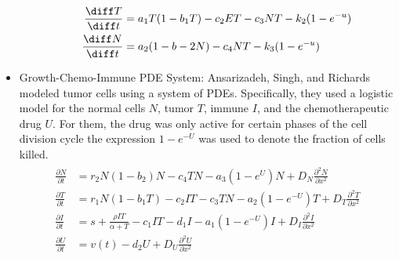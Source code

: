 \documentclass[11pt]{amsart}
\begin{document}
\begin{itemize}
\begin{itemize}
				\begin{eqnarray}
					\begin{aligned}
						\frac{\diff T}{\diff t} &= a_1T(1-b_1T) - c_2ET - c_3NT - k_2(1-e^{-u}) \\
						\frac{\diff N}{\diff t} &= a_2(1-b-2N) - c_4NT - k_3 (1-e^{-u})\label{eq: dePillisTumorImmuno}
					\end{aligned}
				\end{eqnarray}
		\end{itemize}
	\item Growth-Chemo-Immune PDE System: Ansarizadeh, Singh, and Richards modeled tumor cells using a system of PDEs. Specifically, they used a logistic model for the normal cells $N$, tumor $T$, immune $I$, and the chemotherapeutic drug $U$. For them, the drug was only active for certain phases of the cell division cycle the expression $1-e^{-U}$ was used to denote the fraction of cells killed.
		\begin{eqnarray}
			\begin{aligned}
				\frac{\partial N}{\partial t} &= r_2 N (1-b_2)N - c_4TN - a_3(1-e^U)N + D_N \frac{\partial^2 N }{\partial x^2} \\
				\frac{\partial T}{\partial t} &= r_1 N (1-b_1 T) - c_2 IT - c_3TN - a_2(1-e^{-U})T + D_T \frac{\partial^2 T }{\partial x^2} \\
				\frac{\partial I}{\partial t} &= s + \frac{\rho IT}{\alpha + T} - c_1 IT - d_1 I - a_1(1-e^{-U})I +D_I \frac{\partial^2 I }{\partial x^2} \\
				\frac{\partial U}{\partial t} &= v(t) -d_2U + D_U \frac{\partial^2 U}{\partial x^2}\label{eq:GrowthChemoImmunoPDE}
			\end{aligned}
		\end{eqnarray}
\end{itemize}
\end{document}
